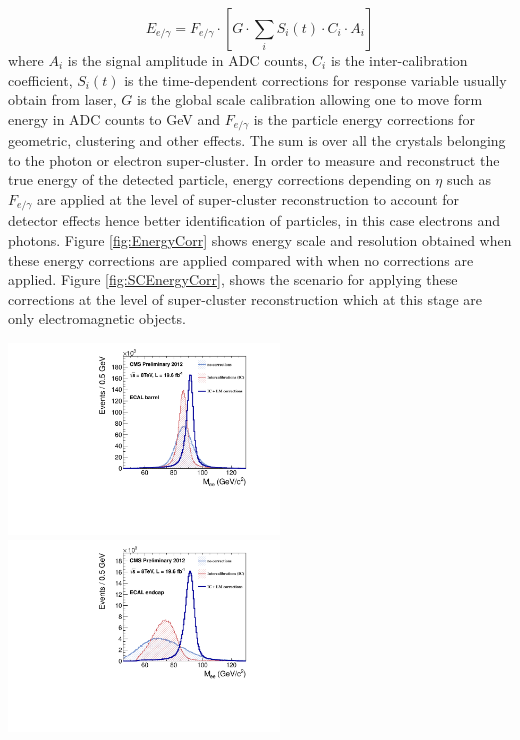 \begin{equation}\label{eq:eEnergy}
E_{e/\gamma} = F_{e/\gamma} \cdot [ G \cdot \sum_{i} S_{i}(t) \cdot C_{i} \cdot A_{i} ]
\end{equation}
where $A_{i}$ is the signal amplitude in ADC counts, $C_{i}$ is the inter-calibration coefficient,  $S_{i}(t)$ is the time-dependent corrections  for response variable usually obtain from laser, $G$ is the global scale calibration allowing one to move form energy in ADC counts to GeV and $F_{e/\gamma}$ is the particle energy corrections for geometric, clustering and other effects. The sum is over all the crystals belonging to the photon or electron super-cluster. In order to measure and reconstruct the true energy of the detected particle, energy corrections depending on $\eta$ such as $F_{e/\gamma}$ are applied at the level of super-cluster reconstruction to account for detector effects hence better identification of particles, in this case electrons and photons. Figure \ref{fig:EnergyCorr} shows energy scale and resolution obtained when these energy corrections are applied compared with when no corrections are applied. Figure \ref{fig:SCEnergyCorr}, shows the scenario for applying these corrections at the level of super-cluster reconstruction which at this stage are only electromagnetic objects.
\begin{center}
\centering
\mbox{\includegraphics[height=2.0in]{THESISPLOTS/propaganda_noIC_noLaser-regrCorr_ele-EB.pdf} \quad 
\includegraphics[height=2.0in]{THESISPLOTS/propaganda_noIC_noLaser-regrCorr_ele-EE.pdf} }
\label{fig:EnergyCorr}
\end{center}

